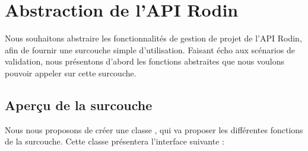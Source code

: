 \chapter{Abstraction de l'API Rodin}

Nous souhaitons abstraire les fonctionnalités de gestion de projet de l'API Rodin, afin de fournir une surcouche simple d'utilisation.
Faisant écho aux scénarios de validation, nous présentons d'abord les fonctions abstraites que nous voulons pouvoir appeler sur cette surcouche.


\section{Aperçu de la surcouche}

Nous nous proposons de créer une classe , qui va proposer les différentes fonctions de la surcouche.
Cette classe présentera l'interface suivante :


